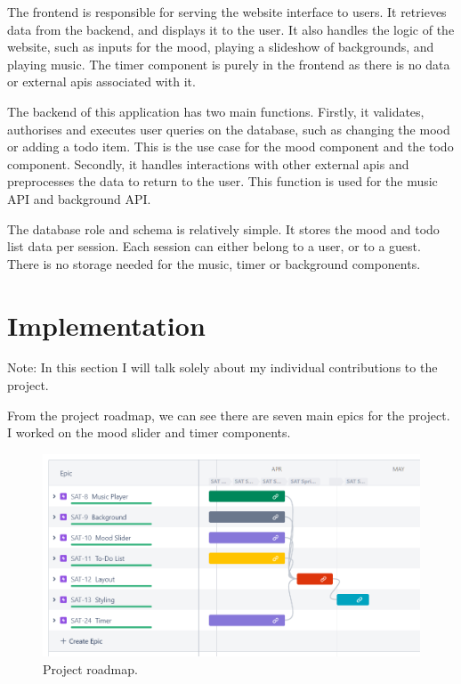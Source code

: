 \documentclass[conference]{IEEEtran}
\begin{document}
The frontend is responsible for serving the website interface to users. It retrieves data from the backend, and displays it to the user. It also handles the logic of the website, such as inputs for the mood, playing a slideshow of backgrounds, and playing music. The timer component is purely in the frontend as there is no data or external apis associated with it.

The backend of this application has two main functions. Firstly, it validates, authorises and executes user queries on the database, such as changing the mood or adding a todo item. This is the use case for the mood component and the todo component. Secondly, it handles interactions with other external apis and preprocesses the data to return to the user. This function is used for the music API and background API.

The database role and schema is relatively simple. It stores the mood and todo list data per session. Each session can either belong to a user, or to a guest. There is no storage needed for the music, timer or background components.


\section{Implementation}

Note: In this section I will talk solely about my individual contributions to the project.

From the project roadmap, we can see there are seven main epics for the project. I worked on the mood slider and timer components.

\begin{figure}[htbp]
\centerline{\includegraphics[width = \linewidth]{project-roadmap.png}}
\caption{Project roadmap.}
\label{fig}
\end{figure}
\end{document}
